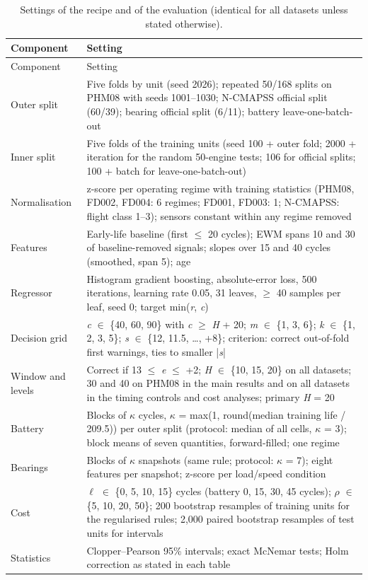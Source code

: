 \documentclass[11pt,a4paper]{article}
\begin{document}
{\footnotesize\setlength{\tabcolsep}{4pt}
\begin{longtable}{@{}>{\raggedright\arraybackslash}p{}>{\raggedright\arraybackslash}p{}@{}}
\caption{Settings of the recipe and of the evaluation (identical for all datasets unless stated otherwise).}\\
\toprule
Component & Setting \\
\midrule\endfirsthead
\toprule
Component & Setting \\
\midrule\endhead
\bottomrule\endfoot
Outer split & Five folds by unit (seed 2026); repeated 50/168 splits on PHM08 with seeds 1001--1030; N-CMAPSS official split (60/39); bearing official split (6/11); battery leave-one-batch-out \\
Inner split & Five folds of the training units (seed 100 + outer fold; 2000 + iteration for the random 50-engine tests; 106 for official splits; 100 + batch for leave-one-batch-out) \\
Normalisation & z-score per operating regime with training statistics (PHM08, FD002, FD004: 6 regimes; FD001, FD003: 1; N-CMAPSS: flight class 1--3); sensors constant within any regime removed \\
Features & Early-life baseline (first $\le$ 20 cycles); EWM spans 10 and 30 of baseline-removed signals; slopes over 15 and 40 cycles (smoothed, span 5); age \\
Regressor & Histogram gradient boosting, absolute-error loss, 500 iterations, learning rate 0.05, 31 leaves, $\ge$ 40 samples per leaf, seed 0; target min(\textit{r}, \textit{c}) \\
Decision grid & \textit{c} $\in$ \{40, 60, 90\} with \textit{c} $\ge$ \textit{H} + 20; \textit{m} $\in$ \{1, 3, 6\}; \textit{k} $\in$ \{1, 2, 3, 5\}; \textit{s} $\in$ \{\textminus{}12, \textminus{}11.5, \ldots{}, +8\}; criterion: correct out-of-fold first warnings, ties to smaller |\textit{s}| \\
Window and levels & Correct if \textminus{}13 $\le$ \textit{e} $\le$ +2; \textit{H} $\in$ \{10, 15, 20\} on all datasets; 30 and 40 on PHM08 in the main results and on all datasets in the timing controls and cost analyses; primary \textit{H} = 20 \\
Battery & Blocks of $\kappa$ cycles, $\kappa$ = max(1, round(median training life / 209.5)) per outer split (protocol: median of all cells, $\kappa$ = 3); block means of seven quantities, forward-filled; one regime \\
Bearings & Blocks of $\kappa$ snapshots (same rule; protocol: $\kappa$ = 7); eight features per snapshot; z-score per load/speed condition \\
Cost & $\ell$ $\in$ \{0, 5, 10, 15\} cycles (battery 0, 15, 30, 45 cycles); $\rho$ $\in$ \{5, 10, 20, 50\}; 200 bootstrap resamples of training units for the regularised rules; 2,000 paired bootstrap resamples of test units for intervals \\
Statistics & Clopper--Pearson 95\% intervals; exact McNemar tests; Holm correction as stated in each table \\
\end{longtable}}
\end{document}
